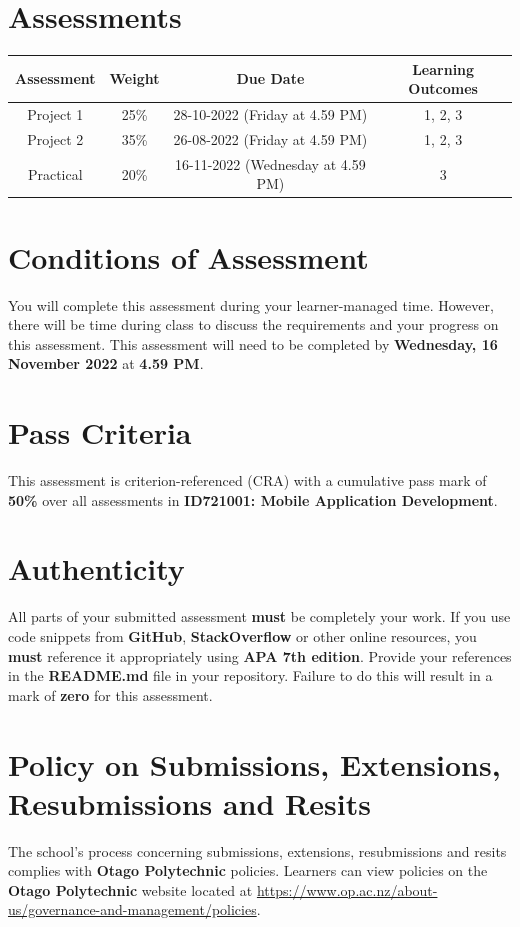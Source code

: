 \documentclass{article}
\begin{document}
\section*{Assessments}
\renewcommand{\arraystretch}{1.5}
\begin{tabular}{|c|c|c|c|}
	\hline
	\textbf{Assessment} & \textbf{Weight} & \textbf{Due Date}    & \textbf{Learning Outcomes} \\ \hline
	Project 1            & 25\%            & 28-10-2022 (Friday at 4.59 PM)  & 1, 2, 3                    \\ \hline
	Project 2         & 35\%            & 26-08-2022 (Friday at 4.59 PM) & 1, 2, 3                    \\ \hline
	Practical       & 20\%            & 16-11-2022 (Wednesday at 4.59 PM) & 3                       \\ \hline
\end{tabular}

\section*{Conditions of Assessment}
You will complete this assessment during your learner-managed time. However, there will be time during class to discuss the requirements and your progress on this assessment. This assessment will need to be completed by \textbf{Wednesday, 16 November 2022} at \textbf{4.59 PM}.

\section*{Pass Criteria}
This assessment is criterion-referenced (CRA) with a cumulative pass mark of \textbf{50\%} over all assessments in \textbf{ID721001: Mobile Application Development}.

\section*{Authenticity}
All parts of your submitted assessment \textbf{must} be completely your work. If you use code snippets from \textbf{GitHub}, \textbf{StackOverflow} or other online resources, you \textbf{must} reference it appropriately using \textbf{APA 7th edition}. Provide your references in the \textbf{README.md} file in your repository. Failure to do this will result in a mark of \textbf{zero} for this assessment.

\section*{Policy on Submissions, Extensions, Resubmissions and Resits}
The school's process concerning submissions, extensions, resubmissions and resits complies with \textbf{Otago Polytechnic} policies. Learners can view policies on the \textbf{Otago Polytechnic} website located at \href{https://www.op.ac.nz/about-us/governance-and-management/policies}{https://www.op.ac.nz/about-us/governance-and-management/policies}.
\end{document}
